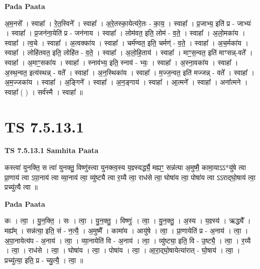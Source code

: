 \documentclass[17pt]{extarticle}
\begin{document}
\textbf{Pada Paata} \newline

अ॒म॒नसे᳚ । स्वाहा᳚ । रे॒त॒स्विने᳚ । स्वाहा᳚ । अ॒रे॒तस्का॒येत्य॑रे॒तः - का॒य॒ । स्वाहा᳚ । प्र॒जाभ्य॒ इति॑ प्र - जाभ्यः॑ । स्वाहा᳚ । प्र॒जन॑ना॒येति॑ प्र - जन॑नाय । स्वाहा᳚ । लोम॑वत॒ इति॒ लोम॑ - व॒ते॒ । स्वाहा᳚ । अ॒लो॒मका॑य । स्वाहा᳚ । त्व॒चे । स्वाहा᳚ । अ॒त्वक्का॑य । स्वाहा᳚ । चर्म॑ण्वत॒ इति॒ चर्मण्॑ -   व॒ते॒ । स्वाहा᳚ । अ॒च॒र्मका॑य । स्वाहा᳚ । लोहि॑तवत॒ इति॒ लोहि॑त - व॒ते॒ । स्वाहा᳚ । अ॒लो॒हि॒ताय॑ । स्वाहा᳚ । माꣳ॒॒स॒न्वत॒ इति॑ माꣳसन्न्-वते᳚ । स्वाहा᳚ । अ॒माꣳ॒॒सका॑य । स्वाहा᳚ । स्नाव॑भ्य॒ इति॒ स्नाव॑ - भ्यः॒ । स्वाहा᳚ । अ॒स्ना॒वका॑य । स्वाहा᳚ । अ॒स्थ॒न्वत॒ इत्य॑स्थन्न् - वते᳚ । स्वाहा᳚ । अ॒न॒स्थिका॑य । स्वाहा᳚ । म॒ज्ज॒न्वत॒ इति॑ मज्जन्न् - वते᳚ । स्वाहा᳚ । अ॒म॒ज्जका॑य । स्वाहा᳚ । अ॒ङ्गिने᳚ । स्वाहा᳚ । अ॒न॒ङ्गाय॑ । स्वाहा᳚ । आ॒त्मने᳚ । स्वाहा᳚ । अना᳚त्मने । स्वाहा᳚ ( ) । सर्व॑स्मै । स्वाहा᳚ ॥  \newline





\section{ TS 7.5.13.1 }

\textbf{TS 7.5.13.1 } \newline
\textbf{Samhita Paata} \newline

कस्त्वा॑ युनक्ति॒ स त्वा॑ युनक्तु॒ विष्णु॑स्त्वा युनक्त्व॒स्य य॒ज्ञ्स्यर्द्ध्यै॒ मह्यꣳ॒॒ सन्न॑त्या अ॒मुष्मै॒ कामा॒याऽऽ*यु॑षे त्वा प्रा॒णाय॑ त्वा ऽपा॒नाय॑ त्वा व्या॒नाय॑ त्वा॒ व्यु॑ष्ट्यै त्वा र॒य्यै त्वा॒ राध॑से त्वा॒ घोषा॑य त्वा॒ पोषा॑य त्वा ऽऽराद्घो॒षाय॑ त्वा॒ प्रच्यु॑त्यै त्वा ॥ \newline

\textbf{Pada Paata} \newline

कः । त्वा॒ । यु॒न॒क्ति॒ । सः । त्वा॒ । यु॒न॒क्तु॒ । विष्णुः॑ । त्वा॒ । यु॒न॒क्तु॒ । अ॒स्य । य॒ज्ञ्स्य॑ । ऋद्ध्यै᳚ । मह्य᳚म् । सन्न॑त्या॒ इति॒ सं - न॒त्यै॒ । अ॒मुष्मै᳚ । कामा॑य । आयु॑षे । त्वा॒ । प्रा॒णायेति॑ प्र - अ॒नाय॑ । त्वा॒ । अ॒पा॒नायेत्य॑प - अ॒नाय॑ । त्वा॒ । व्या॒नायेति॑ वि - अ॒नाय॑ । त्वा॒ । व्यु॑ष्ट्या॒ इति॒ वि - उ॒ष्ट्यै॒ । त्वा॒ । र॒य्यै । त्वा॒ । राध॑से । त्वा॒ । घोषा॑य । त्वा॒ । पोषा॑य । त्वा॒ । आ॒रा॒द्घो॒षायेत्या॑रात् - घो॒षाय॑ । त्वा॒ । प्रच्यु॑त्या॒ इति॒ प्र - च्यु॒त्यै॒ । त्वा॒ ॥  \newline
\end{document}
